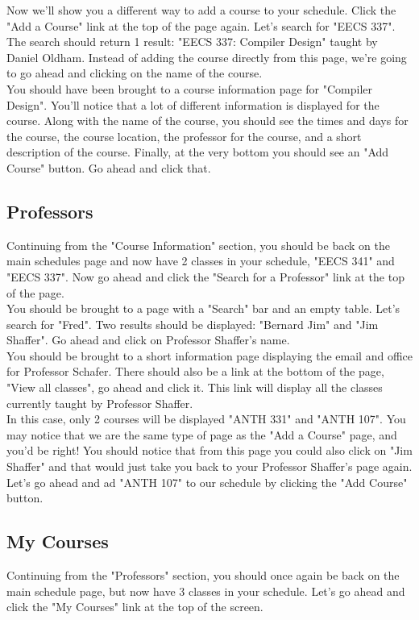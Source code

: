 \documentclass[pdftex,12pt,letter]{article}
\begin{document}
Now we'll show you a different way to add a course to your schedule. Click the "Add a Course" link at the top of the page again. Let's search for "EECS 337". The search should return 1 result: "EECS 337: Compiler Design" taught by Daniel Oldham. Instead of adding the course directly from this page, we're going to go ahead and clicking on the name of the course.\\

You should have been brought to a course information page for "Compiler Design". You'll notice that a lot of different information is displayed for the course. Along with the name of the course, you should see the times and days for the course, the course location, the professor for the course, and a short description of the course. Finally, at the very bottom you should see an "Add Course" button. Go ahead and click that.

\subsection{Professors}
Continuing from the "Course Information" section, you should be back on the main schedules page and now have 2 classes in your schedule, "EECS 341" and "EECS 337". Now go ahead and click the "Search for a Professor" link at the top of the page.\\

You should be brought to a page with a "Search" bar and an empty table. Let's search for "Fred". Two results should be displayed: "Bernard Jim" and "Jim Shaffer". Go ahead and click on Professor Shaffer's name.\\

You should be brought to a short information page displaying the email and office for Professor Schafer. There should also be a link at the bottom of the page, "View all classes", go ahead and click it. This link will display all the classes currently taught by Professor Shaffer.\\

In this case, only 2 courses will be displayed "ANTH 331" and "ANTH 107". You may notice that we are the same type of page as the "Add a Course" page, and you'd be right! You should notice that from this page you could also click on "Jim Shaffer" and that would just take you back to your Professor Shaffer's page again. Let's go ahead and ad "ANTH 107" to our schedule by clicking the "Add Course" button.\\

\subsection{My Courses}
Continuing from the "Professors" section, you should once again be back on the main schedule page, but now have 3 classes in your schedule. Let's go ahead and click the "My Courses" link at the top of the screen.\\
\end{document}
